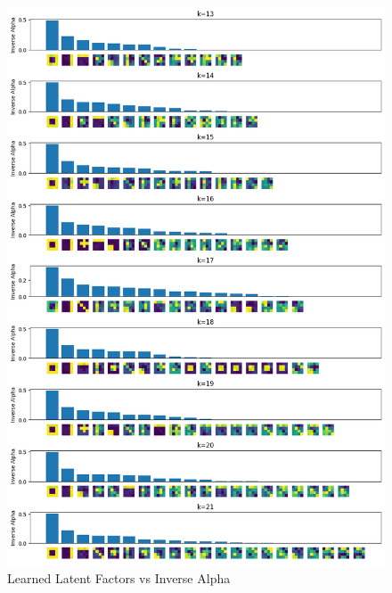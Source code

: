 \documentclass[12pt]{article}
\begin{document}
\newpage
\begin{figure}[h]
\centering
\includegraphics[scale=0.47]{outputs/q4/b-2-latent-factors-comparison}
\caption{Learned Latent Factors vs Inverse Alpha}
\label{fig:}
\end{figure}
\end{document}

